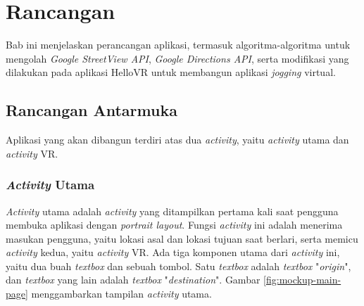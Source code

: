 \chapter{Rancangan}
\label{chap:rancangan}
Bab ini menjelaskan perancangan aplikasi, termasuk algoritma-algoritma untuk mengolah \textit{Google StreetView API}, \textit{Google Directions API}, serta modifikasi yang dilakukan pada aplikasi HelloVR untuk membangun aplikasi \textit{jogging} virtual. 

\section{Rancangan Antarmuka}
Aplikasi yang akan dibangun terdiri atas dua \textit{activity}, yaitu \textit{activity} utama dan \textit{activity} VR.

\subsection{\textit{Activity} Utama}
\label{subs:mockup-main-page}
\textit{Activity} utama adalah \textit{activity} yang ditampilkan pertama kali saat pengguna membuka aplikasi dengan \textit{portrait layout}. Fungsi \textit{activity} ini adalah menerima masukan pengguna, yaitu lokasi asal dan lokasi tujuan saat berlari, serta memicu \textit{activity} kedua, yaitu \textit{activity} VR. Ada tiga komponen utama dari \textit{activity} ini, yaitu dua buah \textit{textbox} dan sebuah tombol. Satu \textit{textbox} adalah \textit{textbox} "\textit{origin}", dan \textit{textbox} yang lain adalah \textit{textbox} "\textit{destination}". Gambar \ref{fig:mockup-main-page} menggambarkan tampilan \textit{activity} utama.  

